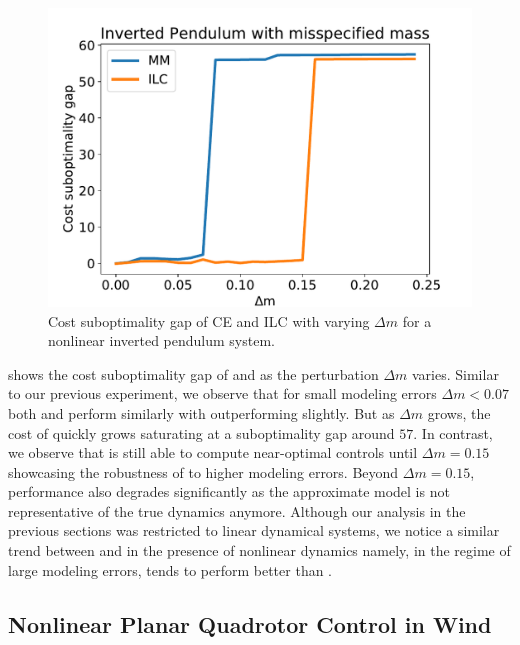 \begin{figure}[t]
  \centering
  \includegraphics[width=.5\linewidth]{figures/ilc/pendulum.pdf}
  \caption{Cost suboptimality gap of CE and ILC with varying $\Delta m$ for a
    nonlinear inverted pendulum system.}
  \label{fig:pendulum}
\end{figure}

 shows the cost suboptimality gap of \MM{} and \ILC{} as the
perturbation $\Delta m$ varies. Similar to our previous experiment, we observe
that for small modeling errors $\Delta m < 0.07$ both \ILC{} and \MM{} perform
similarly with \ILC{} outperforming slightly. But as $\Delta m$ grows, the cost of
\MM{} quickly grows saturating at a suboptimality gap around $57$.
In contrast, we observe that \ILC{}
is still able to compute near-optimal controls until
$\Delta m = 0.15$ showcasing the robustness of \ILC{} to higher modeling errors.
Beyond $\Delta m = 0.15$, \ILC{} performance also degrades significantly as the
approximate model is not representative of the true dynamics anymore.
Although our analysis in the previous sections was restricted to linear
dynamical systems, we notice a similar trend between \ILC{} and \MM{} in the presence
of nonlinear dynamics namely, in the regime of large modeling errors, \ILC{} tends to
perform better than \MM{}.

\subsection{Nonlinear Planar Quadrotor Control in Wind}
\label{sec:nonl-plan-quadr}

